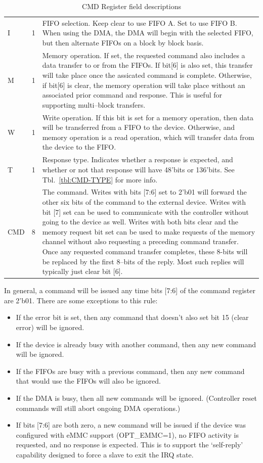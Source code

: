 \documentclass{gqtekspec}
\begin{document}
\begin{table}
\begin{center}
\begin{tabular}{|p{1.2in}|p{0.5in}|p{4.0in}|}
I & 1 & FIFO selection.  Keep clear to use FIFO A.  Set to use FIFO B.
	When using the DMA, the DMA will begin with the selected FIFO, but then
	alternate FIFOs on a block by block basis.  \\
M & 1 & Memory operation.  If set, the requested command also includes a data
	transfer to or from the FIFOs.  If bit[6] is also set, this transfer
	will take place once the assicated command is complete.  Otherwise, if
	bit[6] is clear, the memory operation will take place without an
	associated prior command and response.  This is useful for supporting
	multi--block transfers. \\
W & 1 & Write operation.  If this bit is set for a memory operation, then
	data will be transferred from a FIFO to the device.  Otherwise, and
	memory operation is a read operation, which will transfer data from
	the device to the FIFO.\\
T & 1 & Response type.  Indicates whether a response is expected, and
	whether or not that response will have 48'bits or 136'bits.
	See Tbl.~\ref{tbl:CMD-TYPE} for more info.\\
CMD & 8 & The command.  Writes with bits [7:6] set to 2'b01 will forward
	the other six bits of the command to the external device.  Writes with
	bit [7] set can be used to communicate with the controller without
	going to the device as well.  Writes with both bits clear and the
	memory request bit set can be used to make requests of the memory
	channel without also requesting a preceding command transfer.  Once
	any requested command transfer completes, these 8-bits will be
	replaced by the first 8--bits of the reply.  Most such replies will
	typically just clear bit [6].
	\\\hline
\end{tabular}
\caption{CMD Register field descriptions}\label{tbl:CMD}
\end{center}\end{table}

In general, a command will be issued any time bits [7:6] of the command
register are 2'b01.  There are some exceptions to this rule:
\begin{itemize}
\item If the error bit is set, then any command that doesn't also set bit 15
	(clear error) will be ignored.
\item If the device is already busy with another command, then any new command
	will be ignored.
\item If the FIFOs are busy with a previous command, then any new command that
	would use the FIFOs will also be ignored.
\item If the DMA is busy, then all new commands will be ignored.  (Controller
	reset commands will still abort ongoing DMA operations.)
\item If bits [7:6] are both zero, a new command will be issued if the device
	was configured with eMMC support (OPT\_EMMC=1), no FIFO activity
	is requested, and no response is expected.  This is to support the
	`self-reply' capability designed to force a slave to exit the IRQ
	state.
\end{itemize}
\end{document}
